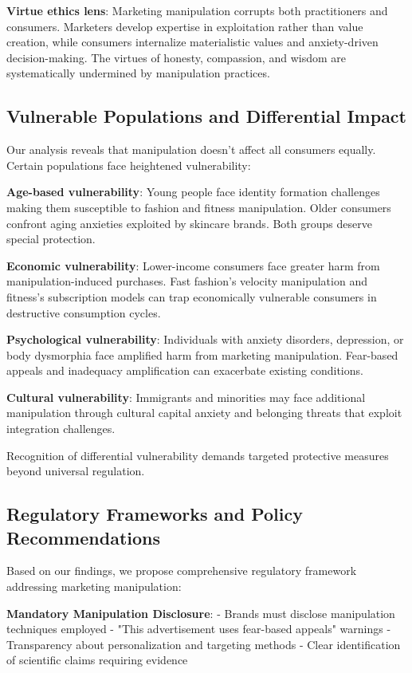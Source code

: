 \textbf{Virtue ethics lens}: Marketing manipulation corrupts both practitioners and consumers. Marketers develop expertise in exploitation rather than value creation, while consumers internalize materialistic values and anxiety-driven decision-making. The virtues of honesty, compassion, and wisdom are systematically undermined by manipulation practices.

\subsection{Vulnerable Populations and Differential Impact}

Our analysis reveals that manipulation doesn't affect all consumers equally. Certain populations face heightened vulnerability:

\textbf{Age-based vulnerability}: Young people face identity formation challenges making them susceptible to fashion and fitness manipulation. Older consumers confront aging anxieties exploited by skincare brands. Both groups deserve special protection.

\textbf{Economic vulnerability}: Lower-income consumers face greater harm from manipulation-induced purchases. Fast fashion's velocity manipulation and fitness's subscription models can trap economically vulnerable consumers in destructive consumption cycles.

\textbf{Psychological vulnerability}: Individuals with anxiety disorders, depression, or body dysmorphia face amplified harm from marketing manipulation. Fear-based appeals and inadequacy amplification can exacerbate existing conditions.

\textbf{Cultural vulnerability}: Immigrants and minorities may face additional manipulation through cultural capital anxiety and belonging threats that exploit integration challenges.

Recognition of differential vulnerability demands targeted protective measures beyond universal regulation.

\subsection{Regulatory Frameworks and Policy Recommendations}

Based on our findings, we propose comprehensive regulatory framework addressing marketing manipulation:

\textbf{Mandatory Manipulation Disclosure}:
- Brands must disclose manipulation techniques employed
- "This advertisement uses fear-based appeals" warnings
- Transparency about personalization and targeting methods
- Clear identification of scientific claims requiring evidence

